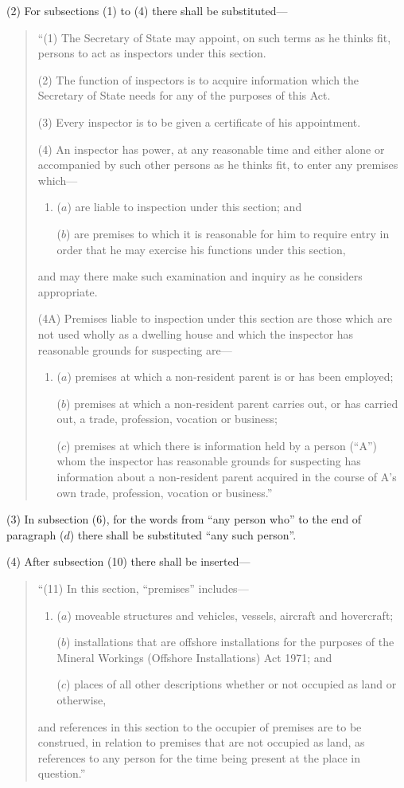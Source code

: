 \documentclass[12pt,a4paper]{article}
\begin{document}
(2) For subsections (1)  to (4)  there shall be substituted—
\begin{quotation}
“(1) The Secretary of State may appoint, on such terms as he thinks fit, persons to act as inspectors under this section.

(2) The function of inspectors is to acquire information which the Secretary of State needs for any of the purposes of this Act.

(3) Every inspector is to be given a certificate of his appointment.

(4) An inspector has power, at any reasonable time and either alone or accompanied by such other persons as he thinks fit, to enter any premises which—
\begin{enumerate}\item[]
($a$) are liable to inspection under this section; and

($b$) are premises to which it is reasonable for him to require entry in order that he may exercise his functions under this section,
\end{enumerate}
and may there make such examination and inquiry as he considers appropriate.

(4A) Premises liable to inspection under this section are those which are not used wholly as a dwelling house and which the inspector has reasonable grounds for suspecting are—
\begin{enumerate}\item[]
($a$) premises at which a non-resident parent is or has been employed;

($b$) premises at which a non-resident parent carries out, or has carried out, a trade, profession, vocation or business;

($c$) premises at which there is information held by a person (“A”) whom the inspector has reasonable grounds for suspecting has information about a non-resident parent acquired in the course of A’s own trade, profession, vocation or business.”
\end{enumerate}
\end{quotation}

(3) In subsection (6), for the words from “any person who” to the end of paragraph ($d$)  there shall be substituted “any such person”.

(4) After subsection (10)  there shall be inserted—
\begin{quotation}
“(11) In this section, “premises” includes—
\begin{enumerate}\item[]
($a$) moveable structures and vehicles, vessels, aircraft and hovercraft;

($b$) installations that are offshore installations for the purposes of the Mineral Workings (Offshore Installations) Act 1971; and

($c$) places of all other descriptions whether or not occupied as land or otherwise,
\end{enumerate}
and references in this section to the occupier of premises are to be construed, in relation to premises that are not occupied as land, as references to any person for the time being present at the place in question.”
\end{quotation}
\end{document}
